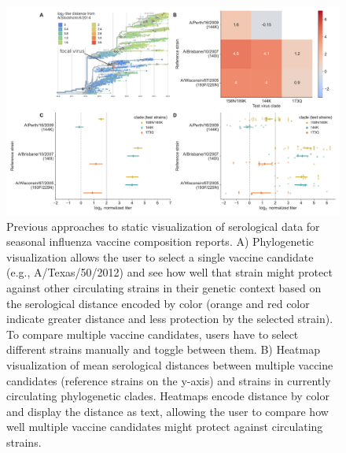 \documentclass[utf8]{FrontiersinHarvard} %
\begin{document}

\begin{figure}[h!]
  \begin{center}
    \includegraphics[width=\textwidth]{figures/figure-1-static-titer-visualizations}
  \end{center}
  \caption{
    Previous approaches to static visualization of serological data for seasonal influenza vaccine composition reports.
A) Phylogenetic visualization \citep{NeherBedford2018} allows the user to select a single vaccine candidate (e.g., A/Texas/50/2012) and see how well that strain might protect against other circulating strains in their genetic context based on the serological distance encoded by color (orange and red color indicate greater distance and less protection by the selected strain).
To compare multiple vaccine candidates, users have to select different strains manually and toggle between them.
B) Heatmap visualization of mean serological distances between multiple vaccine candidates (reference strains on the y-axis) and strains in currently circulating phylogenetic clades.
Heatmaps encode distance by color and display the distance as text, allowing the user to compare how well multiple vaccine candidates might protect against circulating strains.
}
\end{figure}
\end{document}
